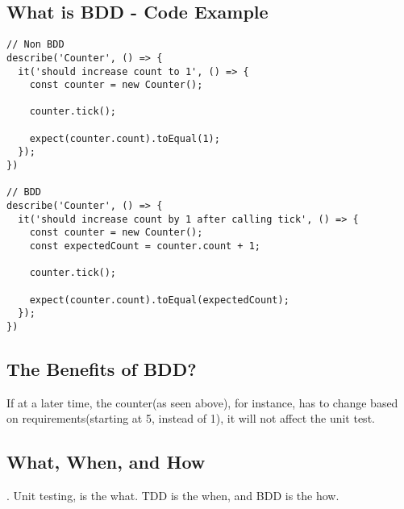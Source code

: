 \subsection{What is BDD - Code Example}
\begin{lstlisting}
// Non BDD
describe('Counter', () => {
  it('should increase count to 1', () => {
    const counter = new Counter();

    counter.tick();

    expect(counter.count).toEqual(1);
  });
})

// BDD
describe('Counter', () => {
  it('should increase count by 1 after calling tick', () => {
    const counter = new Counter();
    const expectedCount = counter.count + 1;

    counter.tick();

    expect(counter.count).toEqual(expectedCount);
  });
})
\end{lstlisting}

\subsection{ The Benefits of BDD? }
If at a later time, the counter(as seen above), for instance, has to change
based on requirements(starting at 5, instead of 1), it will not affect the unit
test.

\subsection{What, When, and How}.
Unit testing, is the what. TDD is the when, and BDD is the how.

